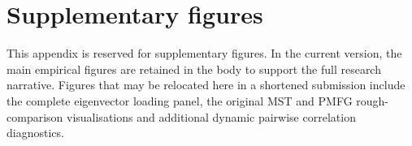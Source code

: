 \section{Supplementary figures}
\label{app:supplementary_figures}


This appendix is reserved for supplementary figures. In the current version, the main empirical figures are retained in the body to support the full research narrative. Figures that may be relocated here in a shortened submission include the complete eigenvector loading panel, the original MST and PMFG rough-comparison visualisations and additional dynamic pairwise correlation diagnostics.
